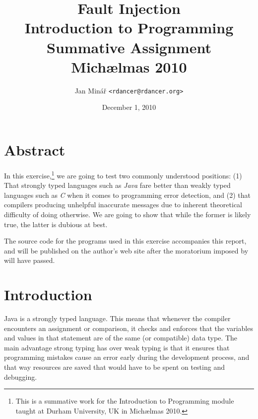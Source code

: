 \documentclass[10pt]{report}
\author{Jan Minář {\tt <rdancer@rdancer.org>}}
\date{December 1, 2010}
\title{Fault Injection\\Introduction to Programming\\Summative Assignment\\Michælmas 2010}
\begin{document}


\maketitle



\chapter{Abstract}
\thispagestyle{fancy}

In this exercise,\footnote{This is a summative work for the Introduction to Programming module taught at Durham University, UK in Michælmas 2010.}
we are going to test two commonly understood positions: (1) That strongly typed languages such as {\em Java} fare better than weakly typed languages such as {\em C} when it comes to programming error detection, and (2) that compilers producing unhelpful inaccurate messages due to inherent theoretical difficulty of doing otherwise.  We are going to show that while the former is likely true, the latter is dubious at best.

The source code for the programs used in this exercise accompanies this report, and will be published on the author's web site after the moratorium imposed by \cite{plagiarism} will have passed.


\chapter{Introduction}
\thispagestyle{fancy}

Java \cite{gosling} is a strongly typed language.  This means that whenever the compiler encounters an assignment or comparison, it checks and enforces that the variables and values in that statement are of the same (or compatible) data type.  The main advantage strong typing has over weak typing is that it ensures that programming mistakes cause an error early during the development process, and that way resources are saved that would have to be spent on testing and debugging.
\end{document}
